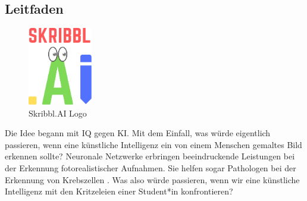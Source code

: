 \documentclass[11pt]{article}
\begin{document}
\subsection{Leitfaden}
\begin{figure}
\centering
\includegraphics[width=0.25\textwidth]{images/logo_skribbl.png}
\caption{\label{fig:skribblLogo}Skribbl.AI Logo}
\end{figure}
Die Idee begann mit IQ gegen KI. Mit dem Einfall, was würde eigentlich passieren, wenn eine künstliche Intelligenz ein von einem Menschen gemaltes Bild  erkennen sollte? Neuronale Netzwerke erbringen beeindruckende Leistungen bei der Erkennung fotorealistischer Aufnahmen. Sie helfen sogar Pathologen bei der Erkennung von Krebszellen \parencite{ElizabethDougherty2018}. Was also würde  passieren, wenn wir eine künstliche Intelligenz mit den Kritzeleien einer Student*in konfrontieren?

 
\end{document}
